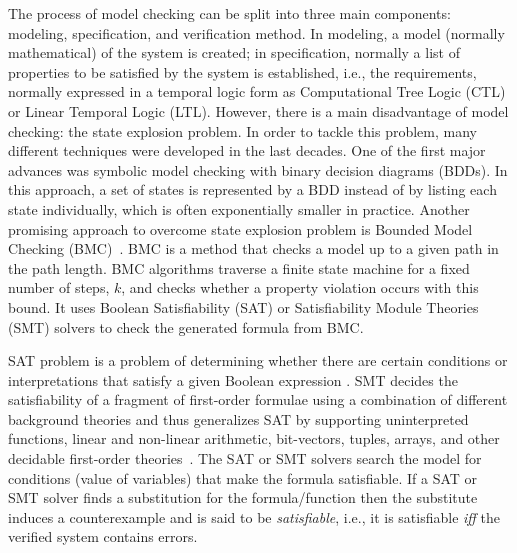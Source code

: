 \documentclass[runningheads]{llncs}
\begin{document}
% 
%
The process of model checking can be split into three main components: modeling, specification, and verification method. In modeling, a model (normally mathematical) of the system is created; in specification, normally a list of properties to be satisfied by the system is established, i.e., the requirements, normally  expressed in a temporal logic form as Computational Tree Logic (CTL) or Linear Temporal Logic (LTL).
%
%
However, there is a main disadvantage of model checking: the state explosion problem. In order to tackle this problem, many different techniques were developed in the last decades. One of the first major advances was symbolic model checking with binary decision diagrams (BDDs). In this approach, a set of states is represented by a BDD instead of by listing each state individually, which is often exponentially smaller in practice.
%
Another promising approach to overcome state explosion problem is Bounded Model Checking (BMC)~\cite{DBLP:conf/tacas/BiereCCZ99}. BMC is a method that checks a model up to a given path in the path length. BMC algorithms traverse a finite state machine for a fixed number of steps, $ k $, and checks whether a property violation occurs with this bound. It uses Boolean Satisfiability (SAT) or Satisfiability Module Theories (SMT) solvers to check the generated formula from BMC. 

SAT problem is a problem of determining whether there are certain conditions or interpretations that satisfy a given Boolean expression \cite{ClarkeHV18}. 
SMT decides the satisfiability of a fragment of first-order formulae using a combination of different background theories and thus generalizes SAT by supporting uninterpreted functions, linear and non-linear arithmetic, bit-vectors, tuples, arrays, and other decidable first-order theories~\cite{ClarkeHV18}.
The SAT or SMT solvers search the model for conditions (value of variables) that make the formula satisfiable. If a SAT or SMT solver finds a substitution for the formula/function then the substitute induces a counterexample and is said to be \textit{satisfiable}, i.e., it is satisfiable \textit{iff} the verified system contains errors.  
%
%
%
\end{document}
